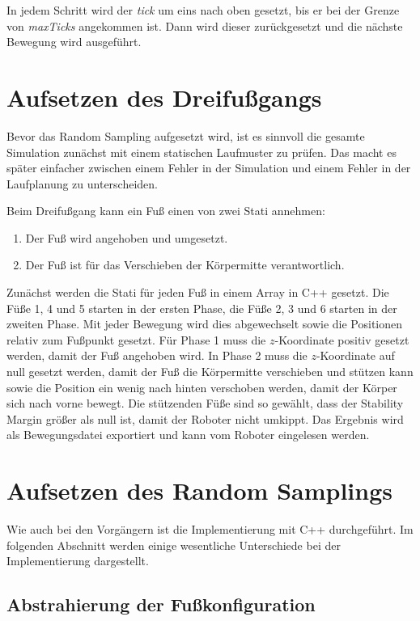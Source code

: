 In jedem Schritt wird der \emph{tick} um eins nach oben gesetzt, bis er bei der Grenze von \emph{maxTicks} angekommen ist. Dann wird dieser zurückgesetzt und die nächste Bewegung wird ausgeführt.

\section{Aufsetzen des Dreifußgangs}

Bevor das Random Sampling aufgesetzt wird, ist es sinnvoll die gesamte Simulation zunächst mit einem statischen Laufmuster zu prüfen. Das macht es später einfacher zwischen einem Fehler in der Simulation und einem Fehler in der Laufplanung zu unterscheiden.

Beim Dreifußgang kann ein Fuß einen von zwei Stati annehmen:
\begin{enumerate}
  \item Der Fuß wird angehoben und umgesetzt.
  \item Der Fuß ist für das Verschieben der Körpermitte verantwortlich.
\end{enumerate}

Zunächst werden die Stati für jeden Fuß in einem Array in C++ gesetzt. Die Füße 1, 4 und 5 starten in der ersten Phase, die Füße 2, 3 und 6 starten in der zweiten Phase. Mit jeder Bewegung wird dies abgewechselt sowie die Positionen relativ zum Fußpunkt gesetzt. Für Phase 1 muss die $z$-Koordinate positiv gesetzt werden, damit der Fuß angehoben wird. In Phase 2 muss die $z$-Koordinate auf null gesetzt werden, damit der Fuß die Körpermitte verschieben und stützen kann sowie die Position ein wenig nach hinten verschoben werden, damit der Körper sich nach vorne bewegt. Die stützenden Füße sind so gewählt, dass der Stability Margin größer als null ist, damit der Roboter nicht umkippt. Das Ergebnis wird als Bewegungsdatei exportiert und kann vom Roboter eingelesen werden.

\section{Aufsetzen des Random Samplings}

Wie auch bei den Vorgängern ist die Implementierung mit C++ durchgeführt. Im folgenden Abschnitt werden einige wesentliche Unterschiede bei der Implementierung dargestellt.

\subsection{Abstrahierung der Fußkonfiguration}

